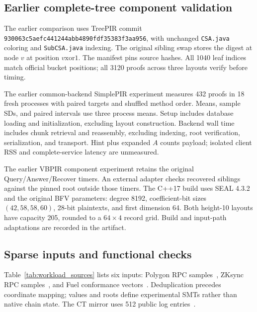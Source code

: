 \subsection{Earlier complete-tree component validation}

The earlier comparison uses TreePIR commit \texttt{930063c5aefc441244abb4890fdf35383f3aa956}, with unchanged \texttt{CSA.java} coloring and \texttt{SubCSA.java} indexing. The original sibling swap stores the digest at node $v$ at position $v\mathbin{\mathrm{xor}}1$. The manifest pins source hashes. All 1040 leaf indices match official bucket positions; all 3120 proofs across three layouts verify before timing.

The earlier common-backend SimplePIR experiment measures 432 proofs in 18 fresh processes with paired targets and shuffled method order. Means, sample SDs, and paired intervals use three process means. Setup includes database loading and initialization, excluding layout construction. Backend wall time includes chunk retrieval and reassembly, excluding indexing, root verification, serialization, and transport. Hint plus expanded $A$ counts payload; isolated client RSS and complete-service latency are unmeasured.

The earlier VBPIR component experiment retains the original Query/Answer/Recover timers. An external adapter checks recovered siblings against the pinned root outside those timers. The C++17 build uses SEAL 4.3.2 and the original BFV parameters: degree 8192, coefficient-bit sizes $(42,58,58,60)$, 28-bit plaintexts, and first dimension 64. Both height-10 layouts have capacity 205, rounded to a $64\times4$ record grid. Build and input-path adaptations are recorded in the artifact.



\subsection{Sparse inputs and functional checks}
\label{sec:workload-evidence}

Table~\ref{tab:workload_sources} lists six inputs: Polygon RPC samples~\cite{polygonzkevm}, ZKsync RPC samples~\cite{zksyncdocs}, and Fuel conformance vectors~\cite{fuelsmtgen}. Deduplication precedes coordinate mapping; values and roots define experimental SMTs rather than native chain state. The CT mirror uses 512 public log entries~\cite{ctlogsample}.

